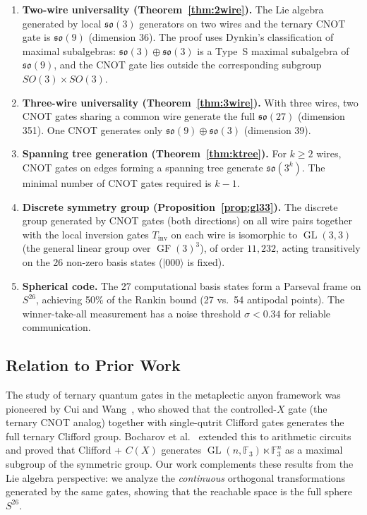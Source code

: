 \documentclass[12pt,a4paper]{article}
\newcommand{\GL}{\operatorname{GL}}
\newcommand{\GF}{\operatorname{GF}}
\begin{document}
\begin{enumerate}
\item \textbf{Two-wire universality (Theorem~\ref{thm:2wire}).} The Lie
algebra generated by local $\mathfrak{so}(3)$ generators on two wires and
the ternary CNOT gate is $\mathfrak{so}(9)$ (dimension 36). The proof uses
Dynkin's classification of maximal subalgebras: $\mathfrak{so}(3)\oplus
\mathfrak{so}(3)$ is a Type~S maximal subalgebra of $\mathfrak{so}(9)$,
and the CNOT gate lies outside the corresponding subgroup
$SO(3)\times SO(3)$.

\item \textbf{Three-wire universality (Theorem~\ref{thm:3wire}).} With
three wires, two CNOT gates sharing a common wire generate the full
$\mathfrak{so}(27)$ (dimension 351). One CNOT generates only
$\mathfrak{so}(9)\oplus\mathfrak{so}(3)$ (dimension 39).

\item \textbf{Spanning tree generation (Theorem~\ref{thm:ktree}).} For
$k\ge 2$ wires, CNOT gates on edges forming a spanning tree generate
$\mathfrak{so}(3^k)$. The minimal number of CNOT gates required is $k-1$.

\item \textbf{Discrete symmetry group (Proposition~\ref{prop:gl33}).}
The discrete group generated by CNOT gates (both directions) on all wire
pairs together with the local inversion gates $T_{\mathrm{inv}}$ on each
wire is isomorphic to $\GL(3,3)$ (the general linear group over
$\GF(3)^3$), of order $11{,}232$, acting transitively on the 26 non-zero
basis states ($|000\rangle$ is fixed).

\item \textbf{Spherical code.} The 27 computational basis states form a
Parseval frame on $S^{26}$, achieving 50\% of the Rankin bound
(27 vs.\ 54 antipodal points). The winner-take-all measurement has a noise
threshold $\sigma < 0.34$ for reliable communication.
\end{enumerate}

\subsection{Relation to Prior Work}

The study of ternary quantum gates in the metaplectic anyon framework
was pioneered by Cui and Wang~\cite{cuietal2015}, who showed that the
controlled-$X$ gate (the ternary CNOT analog) together with single-qutrit
Clifford gates generates the full ternary Clifford group. Bocharov
et al.~\cite{bocharov2016improved} extended this to arithmetic circuits
and proved that Clifford + $C(X)$ generates $\GL(n, \mathbb{F}_3) \ltimes
\mathbb{F}_3^n$ as a maximal subgroup of the symmetric group. Our work
complements these results from the Lie algebra perspective: we analyze
the \emph{continuous} orthogonal transformations generated by the same
gates, showing that the reachable space is the full sphere $S^{26}$.
\end{document}
